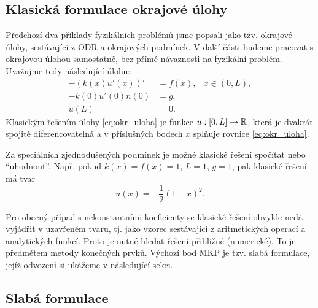 \subsection{Klasická formulace okrajové úlohy}
Předchozí dva příklady fyzikálních problémů jsme popsali jako tzv. okrajové úlohy, sestávající z ODR a okrajových podmínek.
V další části budeme pracovat s okrajovou úlohou samostatně, bez přímé návaznosti na fyzikální problém.
Uvažujme tedy následující úlohu:
\begin{subequations}\label{eq:okr_uloha}
\begin{eqnarray}
-(k(x)u'(x))' &= f(x), &x\in(0,L),\label{eq:poisson}\\
-k(0)u'(0)n(0) &= g,\label{eq:neumann}\\
u(L) &= 0.\label{eq:hom_dirichlet}
\end{eqnarray}
\end{subequations}
Klasickým řešením úlohy \eqref{eq:okr_uloha} je funkce $u:[0,L]\rightarrow{\mathbb R}$, která je dvakrát spojitě diferencovatelná a v příslušných bodech $x$ splňuje rovnice \eqref{eq:okr_uloha}.

\begin{ex}
Za speciálních zjednodušených podmínek je možné klasické řešení spočítat nebo ``uhodnout''.
Např. pokud $k(x)=f(x)=1$, $L=1$, $g=1$, pak klasické řešení má tvar
\[ u(x) = -\frac12(1-x)^2. \]
\end{ex}

Pro obecný případ s nekonstantními koeficienty se klasické řešení obvykle nedá vyjádřit v uzavřeném tvaru, tj. jako vzorec sestávající z aritmetických operací a analytických funkcí.
Proto je nutné hledat řešení přibližné (numerické).
To je předmětem metody konečných prvků.
Výchozí bod MKP je tzv. slabá formulace, jejíž odvození si ukážeme v následující sekci.


\subsection{Slabá formulace}

